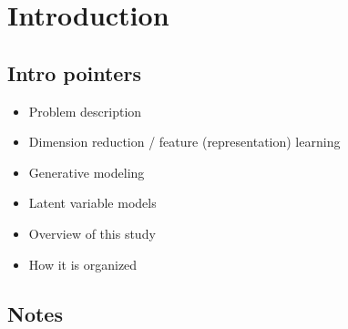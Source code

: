 \section{Introduction}\label{sec:Introduction}



\subsection{Intro pointers}

\begin{itemize}
    \item Problem description
    \item Dimension reduction / feature (representation) learning
    \item Generative modeling
    \item Latent variable models
    \item Overview of this study
    \item How it is organized
\end{itemize}



\subsection{Notes}
